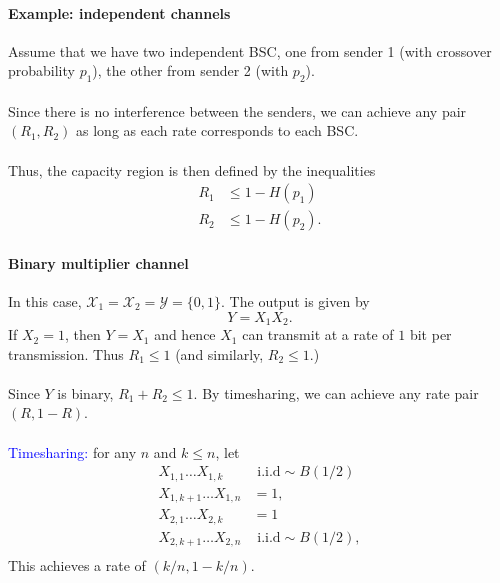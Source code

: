 \documentclass[a4paper, 11pt, openany]{book}
\numberwithin{equation}{section}
\theoremstyle{plain}
\theoremstyle{definition}
\newcommand{\Structure}[1]{\textcolor{blue}{#1}}
\newcommand{\alphabet}[1]{\mathcal{#1}}
\begin{document}
\paragraph{Example: independent channels}
Assume that we have two independent BSC, one from sender 1 (with crossover probability $p_1$), the other from sender 2 (with $p_2$).\\
~\\
Since there is no interference between the senders, we can achieve any pair $(R_1, R_2)$ as long as each rate corresponds to each BSC.\\
~\\
Thus, the capacity region is then defined by the inequalities
\begin{align*}
	R_1 &\le 1 - H(p_1)\\
	R_2 &\le 1 - H(p_2).
\end{align*}











\paragraph{Binary multiplier channel}
In this case, $\alphabet{X}_1 = \alphabet{X}_2 = \alphabet{Y} = \{0,1\}$. The output is given by
\[
	Y = X_1 X_2.
\]
If $X_2 = 1$, then $Y = X_1$ and hence $X_1$ can transmit at a rate of $1$ bit per transmission. Thus $R_1 \le 1$ (and similarly, $R_2 \le 1$.)\\
~\\
Since $Y$ is binary, $R_1 + R_2 \le 1$. By timesharing, we can achieve any rate pair $(R, 1-R)$.\\
~\\
\Structure{Timesharing:} for any $n$ and $k \le n$, let 
\begin{align*}
	X_{1,1} \dots X_{1,k} &\text{ i.i.d} \sim B(1/2)\\
	X_{1,k+1} \dots X_{1,n} &= 1,\\
	X_{2,1} \dots X_{2,k} &= 1\\
	X_{2,k+1} \dots X_{2,n} &\text{ i.i.d} \sim B(1/2),\\
\end{align*}
This achieves a rate of $(k/n, 1-k/n)$.
\end{document}
